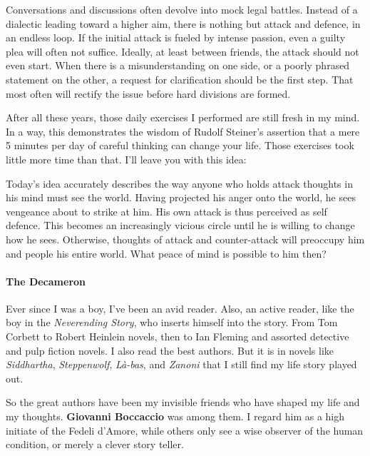 Conversations and discussions often devolve into mock legal battles. Instead of a dialectic leading toward a higher aim, there is nothing but attack and defence, in an endless loop. If the initial attack is fueled by intense passion, even a guilty plea will often not suffice. Ideally, at least between friends, the attack should not even start. When there is a misunderstanding on one side, or a poorly phrased statement on the other, a request for clarification should be the first step. That most often will rectify the issue before hard divisions are formed.

After all these years, those daily exercises I performed are still fresh in my mind. In a way, this demonstrates the wisdom of Rudolf Steiner's assertion that a mere 5 minutes per day of careful thinking can change your life. Those exercises took little more time than that. I'll leave you with this idea:

\begin{quotex}
Today's idea accurately describes the way anyone who holds attack thoughts in his mind must see the world. Having projected his anger onto the world, he sees vengeance about to strike at him. His own attack is thus perceived as self defence. This becomes an increasingly vicious circle until he is willing to change how he sees. Otherwise, thoughts of attack and counter-attack will preoccupy him and people his entire world. What peace of mind is possible to him then?
\end{quotex}


\paragraph{The Decameron}


Ever since I was a boy, I've been an avid reader. Also, an active reader, like the boy in the \emph{Neverending Story}, who inserts himself into the story. From Tom Corbett to Robert Heinlein novels, then to Ian Fleming and assorted detective and pulp fiction novels. I also read the best authors. But it is in novels like \emph{Siddhartha}, \emph{Steppenwolf}, \emph{Là-bas}, and \emph{Zanoni} that I still find my life story played out.

So the great authors have been my invisible friends who have shaped my life and my thoughts. \textbf{Giovanni Boccaccio} was among them. I regard him as a high initiate of the Fedeli d'Amore, while others only see a wise observer of the human condition, or merely a clever story teller.

